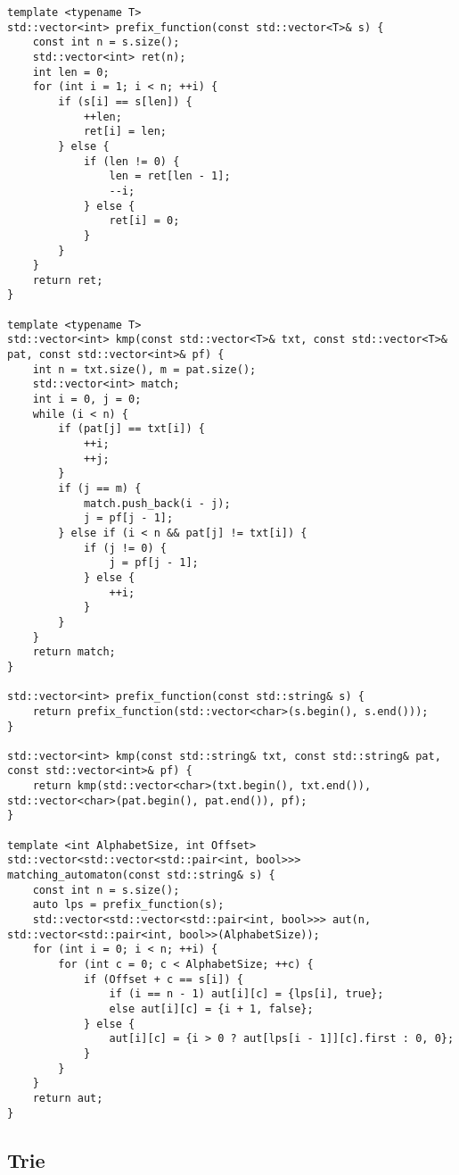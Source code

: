 \begin{lstlisting}
template <typename T>
std::vector<int> prefix_function(const std::vector<T>& s) {
    const int n = s.size();
    std::vector<int> ret(n);
    int len = 0;
    for (int i = 1; i < n; ++i) {
        if (s[i] == s[len]) {
            ++len;
            ret[i] = len;
        } else {
            if (len != 0) {
                len = ret[len - 1];
                --i;
            } else {
                ret[i] = 0;
            }
        }
    }
    return ret;
}

template <typename T>
std::vector<int> kmp(const std::vector<T>& txt, const std::vector<T>& pat, const std::vector<int>& pf) {
    int n = txt.size(), m = pat.size();
    std::vector<int> match;
    int i = 0, j = 0;
    while (i < n) {
        if (pat[j] == txt[i]) {
            ++i;
            ++j;
        }
        if (j == m) {
            match.push_back(i - j);
            j = pf[j - 1];
        } else if (i < n && pat[j] != txt[i]) {
            if (j != 0) {
                j = pf[j - 1];
            } else {
                ++i;
            }
        }
    }
    return match;
}

std::vector<int> prefix_function(const std::string& s) {
    return prefix_function(std::vector<char>(s.begin(), s.end()));
}

std::vector<int> kmp(const std::string& txt, const std::string& pat, const std::vector<int>& pf) {
    return kmp(std::vector<char>(txt.begin(), txt.end()), std::vector<char>(pat.begin(), pat.end()), pf);
}

template <int AlphabetSize, int Offset>
std::vector<std::vector<std::pair<int, bool>>> matching_automaton(const std::string& s) {
    const int n = s.size();
    auto lps = prefix_function(s);
    std::vector<std::vector<std::pair<int, bool>>> aut(n, std::vector<std::pair<int, bool>>(AlphabetSize));
    for (int i = 0; i < n; ++i) {
        for (int c = 0; c < AlphabetSize; ++c) {
            if (Offset + c == s[i]) {
                if (i == n - 1) aut[i][c] = {lps[i], true};
                else aut[i][c] = {i + 1, false};
            } else {
                aut[i][c] = {i > 0 ? aut[lps[i - 1]][c].first : 0, 0};
            }
        }
    }
    return aut;
}
\end{lstlisting}

\subsection{Trie}

